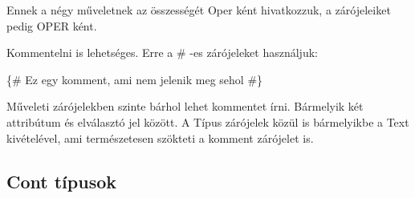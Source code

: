 Ennek a négy műveletnek az összességét Oper ként hivatkozzuk, a zárójeleiket pedig OPER ként.

Kommentelni is lehetséges. Erre a \# -es zárójeleket használjuk:

\{\# Ez egy komment, ami nem jelenik meg sehol \#\}

Műveleti zárójelekben szinte bárhol lehet kommentet írni.
Bármelyik két attribútum és elválasztó jel között.
A Típus zárójelek közül is bármelyikbe a Text kivételével, ami természetesen szökteti a komment zárójelet is.

\subsection{Cont típusok}
\label{sec:SCont}

